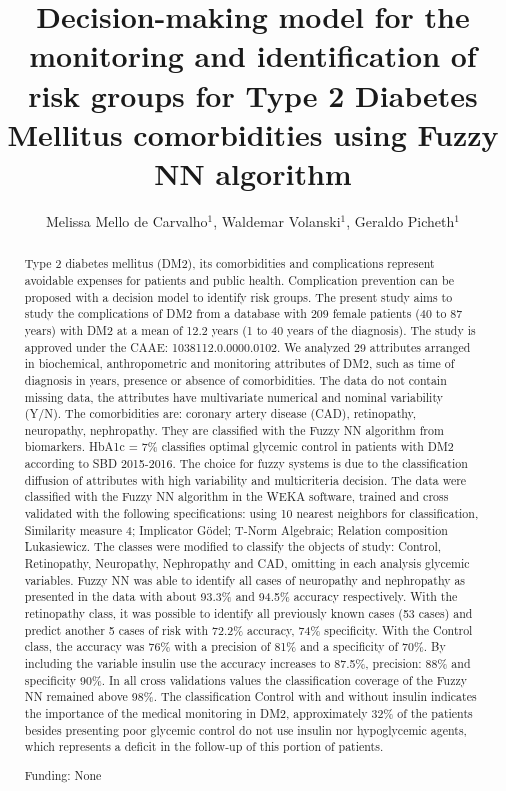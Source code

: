 \documentclass[twoside]{article}
\title{\vspace{-15mm}\fontsize{24pt}{10pt}\selectfont\textbf{Decision-making model for the monitoring and identification of risk groups for Type 2 Diabetes Mellitus comorbidities using Fuzzy NN algorithm}} %
\author{Melissa Mello de Carvalho$^1$, Waldemar Volanski$^1$, Geraldo Picheth$^1$}
\affil{1 UFPR\\ }
\date{}
\begin{document}
\maketitle %

\thispagestyle{fancy} %


\begin{abstract}
Type 2 diabetes mellitus (DM2), its comorbidities and complications represent avoidable expenses for patients and public health. Complication prevention can be proposed with a decision model to identify risk groups. The present study aims to study the complications of DM2 from a database with 209 female patients (40 to 87 years) with DM2 at a mean of 12.2 years (1 to 40 years of the diagnosis). The study is approved under the CAAE: 1038112.0.0000.0102. We analyzed 29 attributes arranged in biochemical, anthropometric and monitoring attributes of DM2, such as time of diagnosis in years, presence or absence of comorbidities. The data do not contain missing data, the attributes have multivariate numerical and nominal variability (Y/N). The comorbidities are: coronary artery disease (CAD), retinopathy, neuropathy, nephropathy. They are classified with the Fuzzy NN algorithm from biomarkers. HbA1c = 7\% classifies optimal glycemic control in patients with DM2 according to SBD 2015-2016. The choice for fuzzy systems is due to the classification diffusion of attributes with high variability and multicriteria decision. The data were classified with the Fuzzy NN algorithm in the WEKA software, trained and cross validated with the following specifications: using 10 nearest neighbors for classification, Similarity measure 4; Implicator G\"odel; T-Norm Algebraic; Relation composition Lukasiewicz. The classes were modified to classify the objects of study: Control, Retinopathy, Neuropathy, Nephropathy and CAD, omitting in each analysis glycemic variables. Fuzzy NN was able to identify all cases of neuropathy and nephropathy as presented in the data with about 93.3\% and 94.5\% accuracy respectively. With the retinopathy class, it was possible to identify all previously known cases (53 cases) and predict another 5 cases of risk with 72.2\% accuracy, 74\% specificity. With the Control class, the accuracy was 76\% with a precision of 81\% and a specificity of 70\%. By including the variable insulin use the accuracy increases to 87.5\%, precision: 88\% and specificity 90\%. In all cross validations values the classification coverage of the Fuzzy NN remained above 98\%. The classification Control with and without insulin indicates the importance of the medical monitoring in DM2, approximately 32\% of the patients besides presenting poor glycemic control do not use insulin nor hypoglycemic agents, which represents a deficit in the follow-up of this portion of patients.

Funding: None
\end{abstract}
\end{document}
